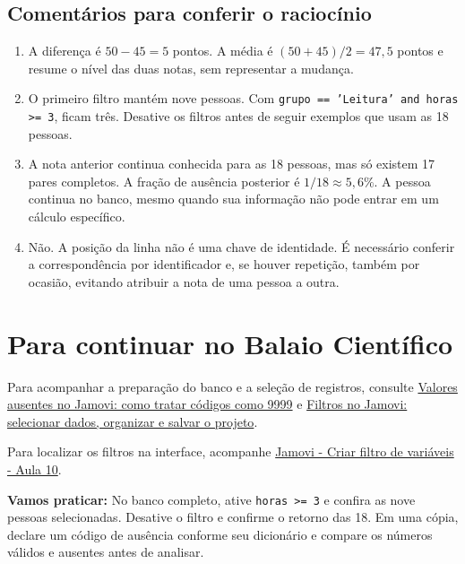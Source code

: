 \subsection{Comentários para conferir o raciocínio}

\begin{enumerate}
  \item A diferença é $50-45=5$ pontos. A média é $(50+45)/2=47{,}5$ pontos e resume o nível das duas notas, sem representar a mudança.
  \item O primeiro filtro mantém nove pessoas. Com \texttt{grupo == 'Leitura' and horas >= 3}, ficam três. Desative os filtros antes de seguir exemplos que usam as 18 pessoas.
  \item A nota anterior continua conhecida para as 18 pessoas, mas só existem 17 pares completos. A fração de ausência posterior é $1/18\approx5{,}6\%$. A pessoa continua no banco, mesmo quando sua informação não pode entrar em um cálculo específico.
  \item Não. A posição da linha não é uma chave de identidade. É necessário conferir a correspondência por identificador e, se houver repetição, também por ocasião, evitando atribuir a nota de uma pessoa a outra.
\end{enumerate}

\section{Para continuar no Balaio Científico}

Para acompanhar a preparação do banco e a seleção de registros, consulte \href{https://www.balaiocientifico.com/2026/10/valores-ausentes-no-jamovi-como-tratar.html}{Valores ausentes no Jamovi: como tratar códigos como 9999} e \href{https://www.balaiocientifico.com/2026/10/filtros-no-jamovi-selecionar-dados.html}{Filtros no Jamovi: selecionar dados, organizar e salvar o projeto}.

Para localizar os filtros na interface, acompanhe \href{https://www.youtube.com/watch?v=D_HNd7RnRO0}{Jamovi - Criar filtro de variáveis - Aula 10}.

\textbf{Vamos praticar:} No banco completo, ative \texttt{horas >= 3} e confira as nove pessoas selecionadas. Desative o filtro e confirme o retorno das 18. Em uma cópia, declare um código de ausência conforme seu dicionário e compare os números válidos e ausentes antes de analisar.
